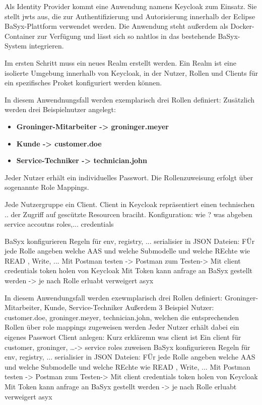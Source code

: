 Als Identity Provider kommt eine Anwendung namens Keycloak zum Einsatz. 
Sie stellt \acsp{jwt} aus, die zur Authentifizierung und Autorisierung innerhalb der Eclipse BaSyx-Plattform verwendet werden.
Die Anwendung steht außerdem als Docker-Container zur Verfügung und lässt sich so nahtlos in das bestehende BaSyx-System integrieren.

Im ersten Schritt muss ein neues Realm erstellt werden. 
Ein Realm ist eine isolierte Umgebung innerhalb von Keycloak, in der Nutzer, Rollen und Clients für ein spezifisches Proket konfiguriert werden können.

In diesem Anwendnungsfall werden exemplarisch drei Rollen definiert:
Zusätzlich werden drei Beispielnutzer angelegt:

\begin{itemize}[noitemsep, leftmargin=*]
    \item \textbf{Groninger-Mitarbeiter -> groninger.meyer} 
    \item \textbf{Kunde -> customer.doe} 
    \item \textbf{Service-Techniker -> technician.john} 
\end{itemize}


Jeder Nutzer erhält ein individuelles Passwort. Die Rollenzuweisung erfolgt über sogenannte Role Mappings.

Jede Nutzergruppe ein Client. Client in Keycloak repräsentiert einen technischen .. der Zugriff auf gescützte Resourcen braciht.
Konfiguration: wie ? was abgeben service accoutns roles,... credentials 

BaSyx konfigurieren Regeln für env, registry, ... serialisier in JSON Dateien: 
FÜr jede Rolle angeben welche AAS und welche Submodelle und welche REchte wie READ , Write, ...
Mit Postman testen -> 
Postman zum Testen-> Mit client credentials token holen von Keycloak
Mit Token kann anfrage an BaSyx gestellt werden
 -> je nach Rolle erluabt verweigert asyx 


In diesem Anwendungsfall werden exewmplarisch drei Rollen definiert: Groninger-Mitarbeiter, Kunde, Service-Techniker
Außerdem 3 Beispiel Nutzer: customer.doe, groninger.meyer, technician.john, welchen die entsprechenden Rollen über role mappings zugeweisen werden 
Jeder Nutzer erhält dabei ein eigenes Passwort
Client anlegen: Kurz erkläremn was client ist
Ein client für customer, groninger, \dots -> service roles zuweisen
BaSyx konfigurieren Regeln für env, registry, ... serialisier in JSON Dateien: 
FÜr jede Rolle angeben welche AAS und welche Submodelle und welche REchte wie READ , Write, ...
Mit Postman testen -> 
Postman zum Testen-> Mit client credentials token holen von Keycloak
Mit Token kann anfrage an BaSyx gestellt werden
 -> je nach Rolle erluabt verweigert asyx 


